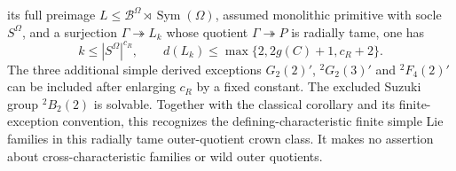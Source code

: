 \begin{corollary}
\[\]
its full preimage
$L\leq\mathcal B^\Omega\rtimes\operatorname{Sym}(\Omega)$,
assumed monolithic primitive with socle $S^\Omega$, and a
surjection $\Gamma\twoheadrightarrow L_k$ whose quotient
$\Gamma\twoheadrightarrow P$ is radially tame, one has
\[
 k\leq|S^\Omega|^{c_R},\qquad
 d(L_k)\leq\max\{2,2g(C)+1,c_R+2\}.                       \tag{D.EC.3}
\]
The three additional simple derived exceptions
$G_2(2)'$, ${}^2G_2(3)'$ and ${}^2F_4(2)'$ can be included
after enlarging $c_R$ by a fixed constant. The excluded
Suzuki group ${}^2B_2(2)$ is solvable. Together with the
classical corollary and its finite-exception convention,
this recognizes the defining-characteristic finite simple
Lie families in this radially tame outer-quotient crown
class. It makes no assertion about cross-characteristic
families or wild outer quotients.
\end{corollary}

